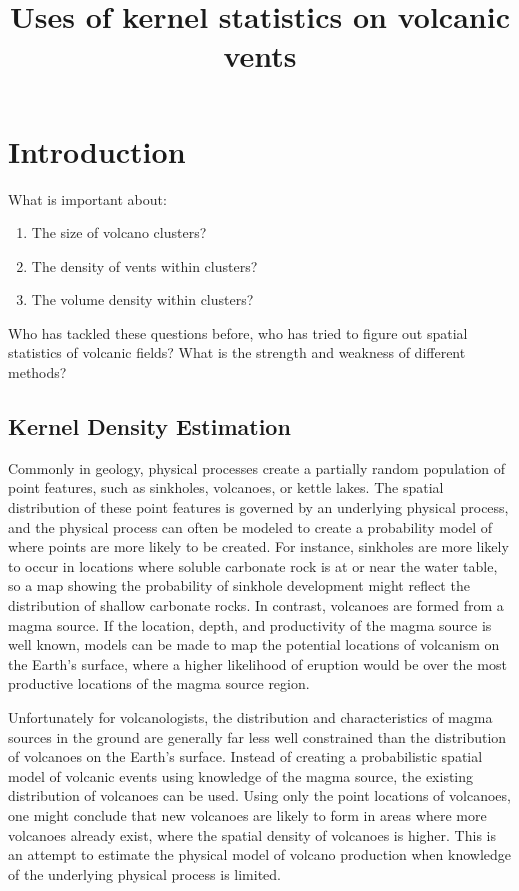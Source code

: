 \documentclass[12pt,letter]{article}
\title{Uses of kernel statistics on volcanic vents}
\date{}
\author{}
\begin{document}
\maketitle

\section{Introduction}

What is important about:
\begin{enumerate}
\item The size of volcano clusters?
\item The density of vents within clusters?
\item The volume density within clusters?
\end{enumerate}

Who has tackled these questions before, who has tried to figure out spatial statistics
of volcanic fields? What is the strength and weakness of different methods?


\subsection{Kernel Density Estimation}
Commonly in geology, physical processes create a partially random population of point features, such as sinkholes, volcanoes, or kettle lakes. The spatial distribution of these point features is governed by an underlying physical process, and the physical process can often be modeled to create a probability model of where points are more likely to be created. For instance, sinkholes are more likely to occur in locations where soluble carbonate rock is at or near the water table, so a map showing the probability of sinkhole development might reflect the distribution of shallow carbonate rocks. In contrast, volcanoes are formed from a magma source. If the location, depth, and productivity of the magma source is well known, models can be made to map the potential locations of volcanism on the Earth's surface, where a higher likelihood of eruption would be over the most productive locations of the magma source region. 

Unfortunately for volcanologists, the distribution and characteristics of magma sources in the ground are generally far less well constrained than the distribution of volcanoes on the Earth's surface. Instead of creating a probabilistic spatial model of volcanic events using knowledge of the magma source, the existing distribution of volcanoes can be used. Using only the point locations of volcanoes, one might conclude that new volcanoes are likely to form in areas where more volcanoes already exist, where the spatial density of volcanoes is higher. This is an attempt to estimate the physical model of volcano production when knowledge of the underlying physical process is limited.
\end{document}
